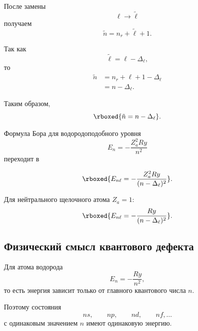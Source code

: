 \documentclass[../final.tex]{subfiles}
\begin{document}
После замены
\begin{equation*}
    \ell\rightarrow\tilde\ell
\end{equation*}
получаем
\begin{equation*}
    \tilde n
    =
    n_r+\tilde\ell+1.
\end{equation*}

Так как
\begin{equation*}
    \tilde\ell=\ell-\Delta_\ell,
\end{equation*}
то
\begin{align*}
    \tilde n
    &=
    n_r+\ell+1-\Delta_\ell
    \\
    &=
    n-\Delta_\ell.
\end{align*}

Таким образом,
\begin{equation*}
    \rboxed{
        \tilde n=n-\Delta_\ell
    }.
\end{equation*}

Формула Бора для водородоподобного уровня
\begin{equation*}
    E_n
    =
    -\frac{Z_a^2Ry}{n^2}
\end{equation*}
переходит в

\begin{equation*}
    \rboxed{
        E_{n\ell}
        =
        -\frac{Z_a^2Ry}
        {(n-\Delta_\ell)^2}
    }.
\end{equation*}


Для нейтрального щелочного атома \(Z_a=1\):
\begin{equation*}
    \rboxed{
        E_{n\ell}
        =
        -\frac{Ry}
        {(n-\Delta_\ell)^2}
    }.
\end{equation*}

\subsection{Физический смысл квантового дефекта}

Для атома водорода
\begin{equation*}
    E_n
    =
    -\frac{Ry}{n^2},
\end{equation*}
то есть энергия зависит только от главного квантового числа \(n\).

Поэтому состояния
\begin{equation*}
    ns,\qquad
    np,\qquad
    nd,\qquad
    nf,\ldots
\end{equation*}
с одинаковым значением \(n\) имеют одинаковую энергию.
\end{document}

